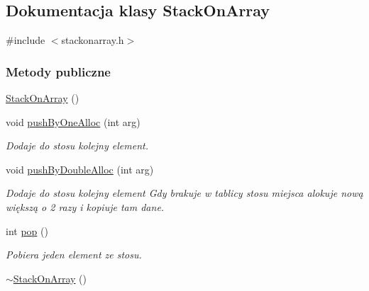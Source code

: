 \hypertarget{class_stack_on_array}{\subsection{Dokumentacja klasy Stack\-On\-Array}
\label{class_stack_on_array}
}


{\ttfamily \#include $<$stackonarray.\-h$>$}

\subsubsection*{Metody publiczne}
\begin{DoxyCompactItemize}
\item 
\hyperlink{class_stack_on_array_af38b74a0a8e2d3069011bfa54b48a2ca}{Stack\-On\-Array} ()
\item 
void \hyperlink{class_stack_on_array_ac7fa8b75445347395d43aa8f5ec1ea12}{push\-By\-One\-Alloc} (int arg)
\begin{DoxyCompactList}\small\item\em Dodaje do stosu kolejny element. \end{DoxyCompactList}\item 
void \hyperlink{class_stack_on_array_aba571bc37f57971aceda9fce2f4e874a}{push\-By\-Double\-Alloc} (int arg)
\begin{DoxyCompactList}\small\item\em Dodaje do stosu kolejny element Gdy brakuje w tablicy stosu miejsca alokuje nową większą o 2 razy i kopiuje tam dane. \end{DoxyCompactList}\item 
int \hyperlink{class_stack_on_array_aec7fb2364539f1102108a17b37f25860}{pop} ()
\begin{DoxyCompactList}\small\item\em Pobiera jeden element ze stosu. \end{DoxyCompactList}\item 
\hyperlink{class_stack_on_array_a95a0d626ff3b5753e961a2b80b1524a6}{$\sim$\-Stack\-On\-Array} ()
\end{DoxyCompactItemize}
